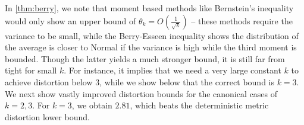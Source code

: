 
In \cref{thm:berry}, we note that moment based methods like Bernstein's inequality~\cite{Boucheron} would only show an upper bound of $\theta_k = O\left(\frac{1}{\sqrt{k}}\right)$ -- these methods require the variance to be small, while the Berry-Esseen inequality shows the distribution of the average is closer to Normal if the variance is high while the third moment is bounded. Though the latter yields a much stronger bound, it is still far from tight for small $k$. For instance, it implies that we need a very large constant $k$ to achieve distortion below $3$, while we show below that the correct bound is $k = 3$. We next show vastly improved distortion bounds for the canonical cases of $k = 2,3$. For $k=3$, we obtain $2.81$, which beats the deterministic metric distortion lower bound. %

